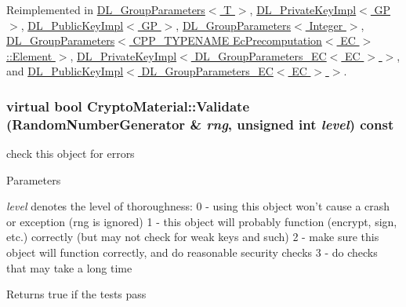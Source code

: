 Reimplemented in \hyperlink{class_d_l___group_parameters_a42a423fd9d31e77a1d36e7da66da12bb}{DL\_\-GroupParameters$<$ T $>$}, \hyperlink{class_d_l___private_key_impl_ae8e4b6e0d700c92852a0c3edbb9afaee}{DL\_\-PrivateKeyImpl$<$ GP $>$}, \hyperlink{class_d_l___public_key_impl_a16711647065fe1c20f118460646ccc38}{DL\_\-PublicKeyImpl$<$ GP $>$}, \hyperlink{class_d_l___group_parameters_a42a423fd9d31e77a1d36e7da66da12bb}{DL\_\-GroupParameters$<$ Integer $>$}, \hyperlink{class_d_l___group_parameters_a42a423fd9d31e77a1d36e7da66da12bb}{DL\_\-GroupParameters$<$ CPP\_\-TYPENAME EcPrecomputation$<$ EC $>$::Element $>$}, \hyperlink{class_d_l___private_key_impl_ae8e4b6e0d700c92852a0c3edbb9afaee}{DL\_\-PrivateKeyImpl$<$ DL\_\-GroupParameters\_\-EC$<$ EC $>$ $>$}, and \hyperlink{class_d_l___public_key_impl_a16711647065fe1c20f118460646ccc38}{DL\_\-PublicKeyImpl$<$ DL\_\-GroupParameters\_\-EC$<$ EC $>$ $>$}.\hypertarget{class_crypto_material_aaa7d67d0c12712de0e33713c73f5b718}{
\subsubsection[{Validate}]{\setlength{\rightskip}{0pt plus 5cm}virtual bool CryptoMaterial::Validate ({\bf RandomNumberGenerator} \& {\em rng}, \/  unsigned int {\em level}) const}}
\label{class_crypto_material_aaa7d67d0c12712de0e33713c73f5b718}


check this object for errors 
\begin{DoxyParams}{Parameters}
\item[{\em level}]denotes the level of thoroughness: 0 -\/ using this object won't cause a crash or exception (rng is ignored) 1 -\/ this object will probably function (encrypt, sign, etc.) correctly (but may not check for weak keys and such) 2 -\/ make sure this object will function correctly, and do reasonable security checks 3 -\/ do checks that may take a long time \end{DoxyParams}
\begin{DoxyReturn}{Returns}
true if the tests pass 
\end{DoxyReturn}


